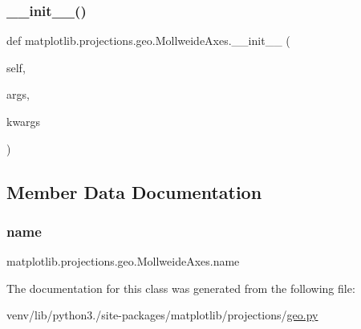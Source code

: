 \subsubsection{\texorpdfstring{\+\_\+\+\_\+init\+\_\+\+\_\+()}{\_\_init\_\_()}}
{\footnotesize\ttfamily def matplotlib.\+projections.\+geo.\+Mollweide\+Axes.\+\_\+\+\_\+init\+\_\+\+\_\+ (\begin{DoxyParamCaption}\item[{}]{self,  }\item[{}]{args,  }\item[{}]{kwargs }\end{DoxyParamCaption})}



\subsection{Member Data Documentation}
\mbox{\label{classmatplotlib_1_1projections_1_1geo_1_1MollweideAxes_a6e034a04678e41af56fca5bcc35715ab}} 
\subsubsection{\texorpdfstring{name}{name}}
{\footnotesize\ttfamily matplotlib.\+projections.\+geo.\+Mollweide\+Axes.\+name\hspace{0.3cm}{\ttfamily [static]}}



The documentation for this class was generated from the following file\+:\begin{DoxyCompactItemize}
\item 
venv/lib/python3./site-\/packages/matplotlib/projections/\hyperlink{geo_8py}{geo.\+py}\end{DoxyCompactItemize}
